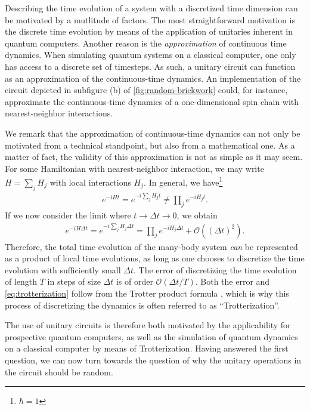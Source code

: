 Describing the time evolution of a system with a discretized time dimension can
be motivated by a mutlitude of factors. The most straightforward motivation is
the discrete time evolution by means of the application of unitaries inherent
in quantum computers.  Another reason is the \emph{approximation} of continuous
time dynamics. When simulating quantum systems on a classical computer, one
only has access to a discrete set of timesteps. As such, a unitary circuit can
function as an approximation of the continuous-time dynamics. An implementation
of the circuit depicted in subfigure (b) of \cref{fig:random-brickwork} could,
for instance, approximate the continuous-time dynamics of a one-dimensional
spin chain with nearest-neighbor interactions.

We remark that the approximation of continuous-time dynamics can not only be
motivated from a technical standpoint, but also from a mathematical one. As a
matter of fact, the validity of this approximation is not as simple as it may
seem. For some Hamiltonian with nearest-neighbor interaction, we may write
$H= \sum_j H_j$ with local interactions $H_j$. In general, we
have\footnote{$\hbar=1$}
\begin{align}
  e^{-iHt} = e^{-i\sum_j H_j t} \neq \prod_j e^{-iH_jt}
.\end{align}
If we now consider the limit where $t \to \Delta t \to 0$, we obtain
\begin{align}\label{eq:trotterization}
  e^{-iH\Delta t} = e^{-i\sum_j H_j \Delta t} = \prod_j e^{-iH_j \Delta t} +
  \mathcal{O}\left(\left(\Delta t\right)^2\right)
.\end{align}
Therefore, the total time evolution of the many-body system \emph{can} be
represented as a product of local time evolutions, as long as one chooses to
discretize the time evolution with sufficiently small $\Delta t$. The error of
discretizing the time evolution of length $T$ in steps of size $\Delta t$ is of
order $\mathcal{O}(\Delta t / T)$. Both the error and \cref{eq:trotterization}
follow from the Trotter product formula
\cite{hallElementaryIntroductionGroups2000}, which is why this process of
discretizing the dynamics is often referred to as \enquote{Trotterization}.

The use of unitary circuits is therefore both motivated by the applicability
for prospective
quantum computers, as well as the simulation of quantum dynamics on a
classical computer by means of Trotterization. Having answered the first
question, we can now turn towards the question of why the unitary operations in
the circuit should be random.

